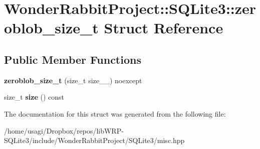 \hypertarget{structWonderRabbitProject_1_1SQLite3_1_1zeroblob__size__t}{\section{Wonder\-Rabbit\-Project\-:\-:S\-Q\-Lite3\-:\-:zeroblob\-\_\-size\-\_\-t Struct Reference}
\label{structWonderRabbitProject_1_1SQLite3_1_1zeroblob__size__t}
}
\subsection*{Public Member Functions}
\begin{DoxyCompactItemize}
\item 
\hypertarget{structWonderRabbitProject_1_1SQLite3_1_1zeroblob__size__t_a2bbe4c7f57f30cfa6789b6bb48c29bae}{{\bfseries zeroblob\-\_\-size\-\_\-t} (size\-\_\-t size\-\_\-\-\_\-) noexcept}\label{structWonderRabbitProject_1_1SQLite3_1_1zeroblob__size__t_a2bbe4c7f57f30cfa6789b6bb48c29bae}

\item 
\hypertarget{structWonderRabbitProject_1_1SQLite3_1_1zeroblob__size__t_a57c3df6b3ce2b004322e65ec1211cd9e}{size\-\_\-t {\bfseries size} () const }\label{structWonderRabbitProject_1_1SQLite3_1_1zeroblob__size__t_a57c3df6b3ce2b004322e65ec1211cd9e}

\end{DoxyCompactItemize}


The documentation for this struct was generated from the following file\-:\begin{DoxyCompactItemize}
\item 
/home/usagi/\-Dropbox/repos/lib\-W\-R\-P-\/\-S\-Q\-Lite3/include/\-Wonder\-Rabbit\-Project/\-S\-Q\-Lite3/misc.\-hpp\end{DoxyCompactItemize}
